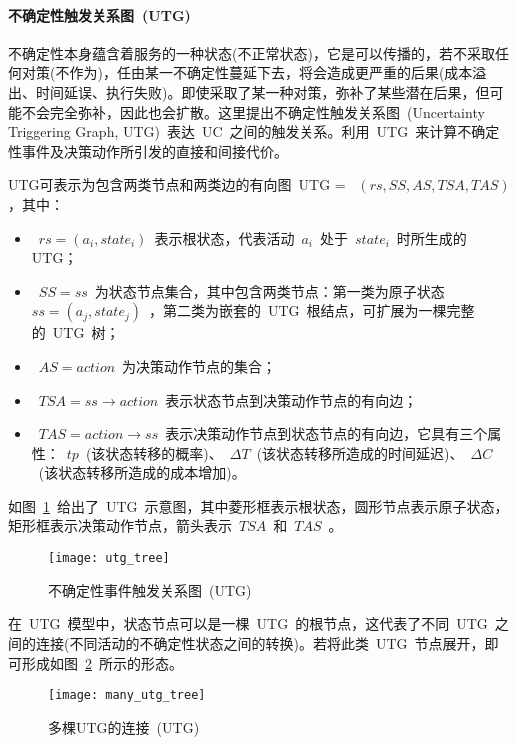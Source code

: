 \paragraph{不确定性触发关系图~(UTG)~} 
不确定性本身蕴含着服务的一种状态(不正常状态)，它是可以传播的，若不采取任何对策(不作为)，任由某一不确定性蔓延下去，将会造成更严重的后果(成本溢出、时间延误、执行失败)。即使采取了某一种对策，弥补了某些潜在后果，但可能不会完全弥补，因此也会扩散。这里提出不确定性触发关系图~(Uncertainty Triggering Graph, UTG)~表达~UC~之间的触发关系。利用~UTG~来计算不确定性事件及决策动作所引发的直接和间接代价。

UTG可表示为包含两类节点和两类边的有向图~UTG = ~$(rs, SS, AS, TSA, TAS)$，其中：
\begin{itemize}
    \item ~$rs=(a_i, state_i)$~表示根状态，代表活动~$a_i$~处于~$state_i$~时所生成的UTG；
    \item ~$SS={ss}$~为状态节点集合，其中包含两类节点：第一类为原子状态~$ss=(a_j, state_j)$~，第二类为嵌套的~UTG~根结点，可扩展为一棵完整的~UTG~树；
    \item ~$AS={action}$~为决策动作节点的集合；
    \item ~$TSA=ss \to action$~表示状态节点到决策动作节点的有向边；
    \item ~$TAS=action \to ss$~表示决策动作节点到状态节点的有向边，它具有三个属性：~$tp$~(该状态转移的概率)、~$\Delta T$~(该状态转移所造成的时间延迟)、~$\Delta C$~(该状态转移所造成的成本增加)。
\end{itemize}

如图~\ref{figure:utg_tree}~给出了~UTG~示意图，其中菱形框表示根状态，圆形节点表示原子状态，矩形框表示决策动作节点，箭头表示~$TSA$~和~$TAS$~。

\begin{figure}[htbp]
    \centering
    \texttt{[image: utg\_tree]}
    \caption{不确定性事件触发关系图~(UTG)~}\label{figure:utg_tree}
    \vspace{-1em}
\end{figure}

在~UTG~模型中，状态节点可以是一棵~UTG~的根节点，这代表了不同~UTG~之间的连接(不同活动的不确定性状态之间的转换)。若将此类~UTG~节点展开，即可形成如图~\ref{figure:many_utg_tree}~所示的形态。

\begin{figure}[htbp]
    \centering
    \texttt{[image: many\_utg\_tree]}
    \caption{多棵UTG的连接~(UTG)~}\label{figure:many_utg_tree}
    \vspace{-1em}
\end{figure}

